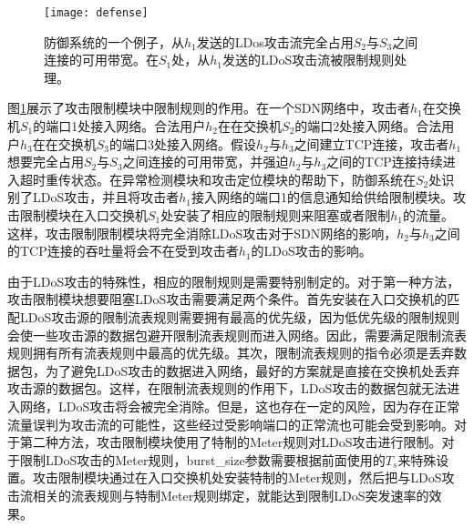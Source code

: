 \begin{figure}
    \centering
    \texttt{[image: defense]}
    \caption{防御系统的一个例子，从$h_1$发送的LDos攻击流完全占用$S_2$与$S_3$之间连接的可用带宽。在$S_1$处，从$h_1$发送的LDoS攻击流被限制规则处理。}
    \label{fig:defense}
\end{figure}

图\ref{fig:defense}展示了攻击限制模块中限制规则的作用。在一个SDN网络中，攻击者$h_1$在交换机$S_1$的端口1处接入网络。合法用户$h_2$在在交换机$S_2$的端口2处接入网络。合法用户$h_3$在在交换机$S_3$的端口3处接入网络。假设$h_2$与$h_3$之间建立TCP连接，攻击者$h_1$想要完全占用$S_2$与$S_3$之间连接的可用带宽，并强迫$h_2$与$h_3$之间的TCP连接持续进入超时重传状态。在异常检测模块和攻击定位模块的帮助下，防御系统在$S_2$处识别了LDoS攻击，并且将攻击者$h_1$接入网络的端口1的信息通知给供给限制模块。攻击限制模块在入口交换机$S_1$处安装了相应的限制规则来阻塞或者限制$h_1$的流量。这样，攻击限制限制模块将完全消除LDoS攻击对于SDN网络的影响，$h_2$与$h_3$之间的TCP连接的吞吐量将会不在受到攻击者$h_1$的LDoS攻击的影响。



由于LDoS攻击的特殊性，相应的限制规则是需要特别制定的。对于第一种方法，攻击限制模块想要阻塞LDoS攻击需要满足两个条件。首先安装在入口交换机的匹配LDoS攻击源的限制流表规则需要拥有最高的优先级，因为低优先级的限制规则会使一些攻击源的数据包避开限制流表规则而进入网络。因此，需要满足限制流表规则拥有所有流表规则中最高的优先级。其次，限制流表规则的指令必须是丢弃数据包，为了避免LDoS攻击的数据进入网络，最好的方案就是直接在交换机处丢弃攻击源的数据包。这样，在限制流表规则的作用下，LDoS攻击的数据包就无法进入网络，LDoS攻击将会被完全消除。但是，这也存在一定的风险，因为存在正常流量误判为攻击流的可能性，这些经过受影响端口的正常流也可能会受到影响。对于第二种方法，攻击限制模块使用了特制的Meter规则对LDoS攻击进行限制。对于限制LDoS攻击的Meter规则，burst\_size参数需要根据前面使用的$T_s$来特殊设置。攻击限制模块通过在入口交换机处安装特制的Meter规则，然后把与LDoS攻击流相关的流表规则与特制Meter规则绑定，就能达到限制LDoS突发速率的效果。

